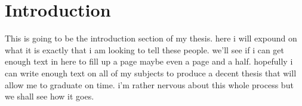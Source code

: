 \chapter{Introduction}
This is going to be the introduction section of my thesis.  here i will expound on what it is exactly that i am looking to tell these people.  we'll see if i can get enough text in here to fill up a page maybe even a page and a half.  hopefully i can write enough text on all of my subjects to produce a decent thesis that will allow me to graduate on time.  i'm rather nervous about this whole process but we shall see how it goes.
